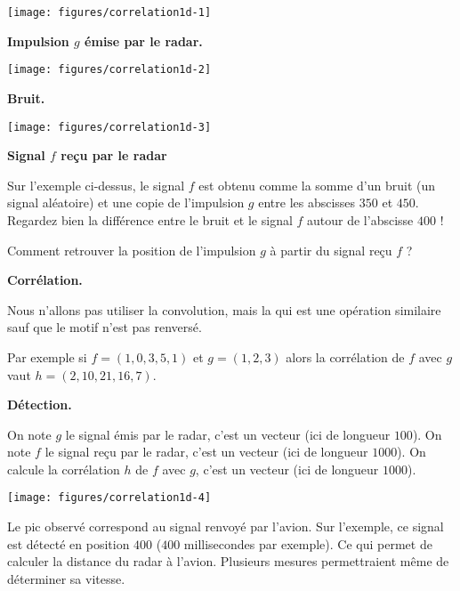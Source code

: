 \documentclass[11pt,class=report,crop=false]{standalone}
\begin{document}
\begin{center}
\texttt{[image: figures/correlation1d-1]}

\textbf{Impulsion $g$ émise par le radar.}
\end{center}

\begin{center}
\texttt{[image: figures/correlation1d-2]}

\textbf{Bruit.}
\end{center}

\begin{center}
\texttt{[image: figures/correlation1d-3]}

\textbf{Signal $f$ reçu par le radar}
\end{center}

Sur l'exemple ci-dessus, le signal $f$ est obtenu comme la somme d'un bruit (un signal aléatoire) et une copie de l'impulsion $g$ entre les abscisses $350$ et $450$. Regardez bien la différence entre le bruit et le signal $f$ autour de l'abscisse $400$ !

Comment retrouver la position de l'impulsion $g$ à partir du signal reçu $f$ ?

\bigskip
\textbf{Corrélation.}

Nous n'allons pas utiliser la convolution, mais la  qui est une opération similaire sauf que le motif n'est pas renversé.

Par exemple si $f =  (1, 0, 3, 5, 1)$ et $g = (1, 2, 3)$ alors la corrélation de $f$ avec $g$ vaut $h = (2, 10, 21, 16,  7)$.

\bigskip
\textbf{Détection.}

On note $g$ le signal émis par le radar, c'est un vecteur (ici de longueur $100$).
On note $f$ le signal reçu par le radar, c'est un vecteur (ici de longueur $1000$).
On calcule la corrélation $h$  de $f$ avec $g$, c'est un vecteur (ici de longueur $1000$).

\begin{center}
\texttt{[image: figures/correlation1d-4]}
\end{center}

Le pic observé correspond au signal renvoyé par l'avion. Sur l'exemple, ce signal est détecté en position $400$ ($400$ millisecondes par exemple). Ce qui permet de calculer la distance du radar à l'avion. Plusieurs mesures permettraient même de déterminer sa vitesse.
\end{document}
